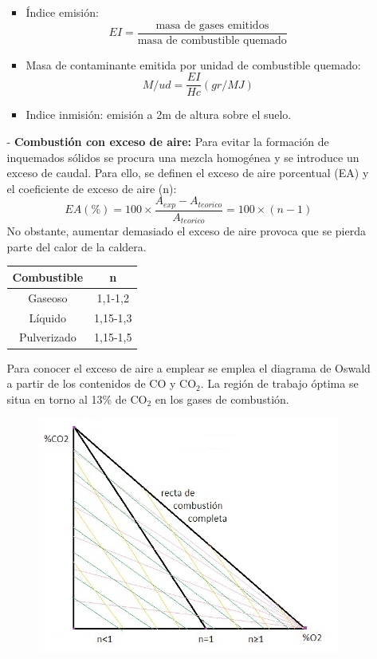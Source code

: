 \begin{enumerate}
\begin{itemize}
			\begin{itemize}
				\item Índice emisión: 
				\[EI=\frac{\text{masa de gases emitidos}}{\text{masa de combustible quemado}}\]
				\item Masa de contaminante emitida por unidad de combustible quemado: 
				\[M/ud= \frac{EI}{Hc} (gr/MJ)\]
				\item Indice inmisión: emisión a 2m de altura sobre el suelo.
			\end{itemize}
			\item [-] \textbf{Combustión con exceso de aire:}
				Para evitar la formación de inquemados sólidos se procura una mezcla homogénea y se introduce un exceso de caudal. Para ello, se definen el exceso de aire porcentual (EA) y el coeficiente de exceso de aire (n):
				\[EA(\%)=100\times\frac{A_{exp}-A_{teorico}}{A_{teorico}}=100\times(n-1)\]
				No obstante, aumentar demasiado el exceso de aire provoca que se pierda parte del calor de la caldera.
				\begin{table}[H]
					\centering
					\renewcommand{\arraystretch}{1.1}
					\begin{tabular}{cc}
						\hline
						\textbf{Combustible}&\textbf{n}\\  
						\hline
						Gaseoso& 1,1-1,2\\
						Líquido & 1,15-1,3\\
						Pulverizado & 1,15-1,5\\ 
						\hline
					\end{tabular}
				\end{table}
				Para conocer el exceso de aire a emplear se emplea el diagrama de Oswald a partir de los contenidos de CO y CO$_2$. La región de trabajo óptima se situa en torno al 13\% de CO$_2$ en los gases de combustión.
				\begin{figure}[H]
					\begin{minipage}{0.6\linewidth}
						\centering
						\includegraphics[width=\linewidth]{res/tema2/oswaldo}

\end{minipage}
\end{figure}
\end{itemize}
\end{enumerate}

